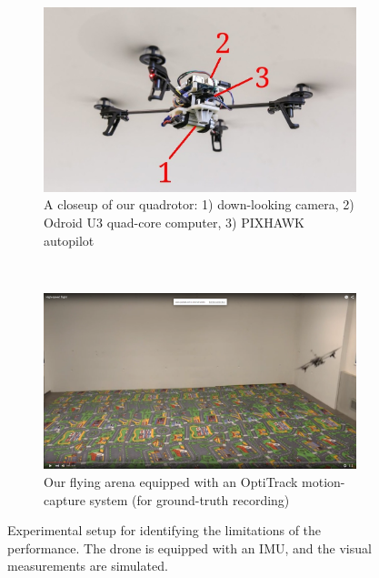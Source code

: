 \documentclass[letterpaper, 10 pt, conference]{ieeeconf}  %
\begin{document}
\begin{figure}
  \begin{subfigure}[t]{0.489\columnwidth}
  \includegraphics[width=\textwidth]{images/quadrotor_closeup.jpg}
  \caption{A closeup of our quadrotor: 1) down-looking camera,
2) Odroid U3 quad-core computer, 3) PIXHAWK autopilot}
  \end{subfigure}~
  \begin{subfigure}[t]{0.489\columnwidth}
  \includegraphics[width=\textwidth, trim={0 2cm 0 4cm}, clip]{images/realExperiment.png}
  \caption{Our flying arena equipped with an OptiTrack motion-capture system (for ground-truth recording)}
  \end{subfigure}
  \caption{Experimental setup for identifying the limitations of the performance.
    The drone is equipped with an IMU, and the visual measurements are simulated.
    \label{fig:testsetup}}
\end{figure}
\end{document}
